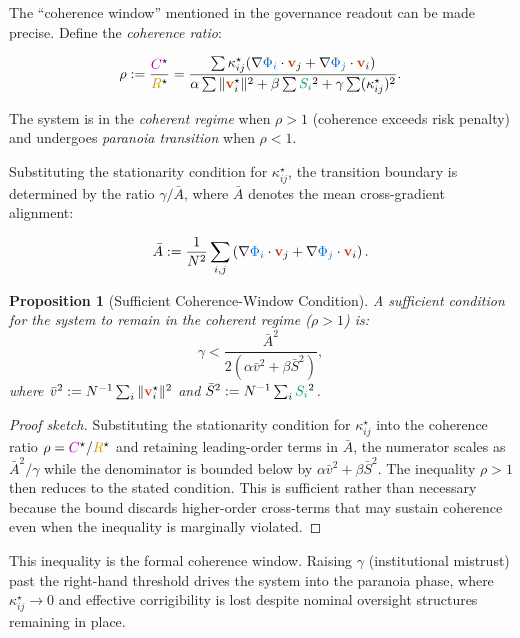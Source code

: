 \documentclass[11pt,a4paper]{article}
\newcommand{\scalar}[1]{\textcolor{scalarcolor}{\ensuremath{#1}}}
\newcommand{\vect}[1]{\textcolor{vectorcolor}{\ensuremath{\mathbf{#1}}}}
\newcommand{\entropy}[1]{\textcolor{entropycolor}{\ensuremath{#1}}}
\newcommand{\coherence}[1]{\textcolor{coherencecolor}{\ensuremath{#1}}}
\newcommand{\risk}[1]{\textcolor{riskcolor}{\ensuremath{#1}}}
\theoremstyle{definition}
\theoremstyle{plain}
\newtheorem{proposition}[theorem]{Proposition}
\begin{document}
\begin{mdframed}[style=appendixbox]
The ``coherence window'' mentioned in the governance readout can be made precise. Define the \emph{coherence ratio}:

\begin{equation}
\rho := \frac{\coherence{C}^{\star}}{\risk{R}^{\star}} = \frac{\sum \kappa_{ij}^{\star}(\nabla\scalar{\Phi_i}\cdot \vect{v}_j + \nabla\scalar{\Phi_j}\cdot \vect{v}_i)}{\alpha\sum \|\vect{v}_i^{\star}\|^2 + \beta\sum \entropy{S_i}^2 + \gamma\sum (\kappa_{ij}^{\star})^2}.
\end{equation}

The system is in the \emph{coherent regime} when $\rho > 1$ (coherence exceeds risk penalty) and undergoes \emph{paranoia transition} when $\rho < 1$.

Substituting the stationarity condition for $\kappa_{ij}^{\star}$, the transition boundary is determined by the ratio $\gamma / \bar{A}$, where $\bar{A}$ denotes the mean cross-gradient alignment:

\begin{equation}
\bar{A} := \frac{1}{N^2}\sum_{i,j} \left(\nabla\scalar{\Phi_i}\cdot \vect{v}_j + \nabla\scalar{\Phi_j}\cdot \vect{v}_i\right).
\end{equation}

\begin{proposition}[Sufficient Coherence-Window Condition]
A sufficient condition for the system to remain in the coherent regime ($\rho > 1$) is:
\begin{equation}
\gamma < \frac{\bar{A}^2}{2(\alpha \bar{v}^2 + \beta \bar{S}^2)},
\end{equation}
where $\bar{v}^2 := N^{-1}\sum_i \|\vect{v}_i^{\star}\|^2$ and $\bar{S}^2 := N^{-1}\sum_i \entropy{S_i}^2$.
\end{proposition}

\begin{proof}[Proof sketch]
Substituting the stationarity condition for $\kappa_{ij}^{\star}$ into the coherence ratio $\rho = \coherence{C}^{\star}/\risk{R}^{\star}$ and retaining leading-order terms in $\bar{A}$, the numerator scales as $\bar{A}^2/\gamma$ while the denominator is bounded below by $\alpha\bar{v}^2 + \beta\bar{S}^2$. The inequality $\rho > 1$ then reduces to the stated condition. This is sufficient rather than necessary because the bound discards higher-order cross-terms that may sustain coherence even when the inequality is marginally violated.
\end{proof}

This inequality is the formal coherence window. Raising $\gamma$ (institutional mistrust) past the right-hand threshold drives the system into the paranoia phase, where $\kappa_{ij}^{\star} \to 0$ and effective corrigibility is lost despite nominal oversight structures remaining in place.


\end{mdframed}
\end{document}
